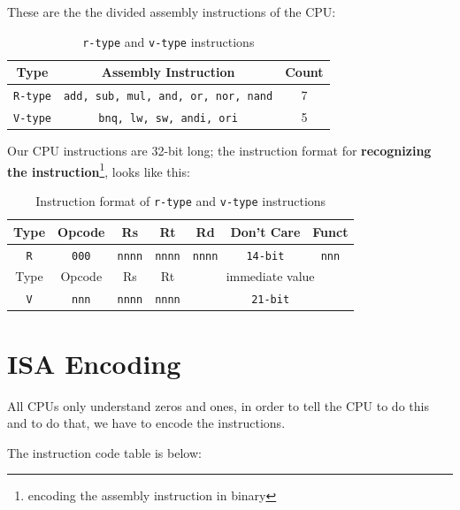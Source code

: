 \documentclass[12pt, dvipsnames, svgnames, x11names, oneside]{book}
\begin{document}
These are the the divided assembly instructions of the CPU:
\begin{table}[h]
\caption{\texttt{r-type} and \texttt{v-type} instructions}
\begin{center}
\begin{tabular}{|c|c|c|}
\hline
Type & Assembly Instruction & Count \\
\hline
\hline
\texttt{R-type} & \texttt{add, sub, mul, and, or, nor, nand} & 7 \\
\hline
\texttt{V-type} & \texttt{bnq, lw, sw, andi, ori} & 5 \\
\hline
\end{tabular}
\end{center}
\end{table}\label{sec:table:isa-insts}

Our CPU instructions are 32-bit long; the instruction format for \textbf{recognizing the instruction}\footnote{encoding the assembly instruction in binary}, looks like this:

\begin{table}[h]
\caption{Instruction format of \texttt{r-type} and \texttt{v-type} instructions}
\begin{center}
\begin{tabular}{|c|c|c|c|c|c|c|}
\hline
Type & Opcode & Rs & Rt & Rd & Don't Care & Funct \\
\hline
\texttt{R} & \texttt{000} & \texttt{nnnn} & \texttt{nnnn} & \texttt{nnnn} & \texttt{14-bit} & \texttt{nnn} \\
\hline
\hline
Type & Opcode & Rs & Rt & \multicolumn{3}{|c|}{immediate value} \\ \hline
\texttt{V} & \texttt{nnn} & \texttt{nnnn} & \texttt{nnnn} & \multicolumn{3}{|c|}{\texttt{21-bit}} \\
\hline
\end{tabular}
\end{center}
\end{table}

\section{ISA Encoding}\label{sec:isa-encode}
All CPUs only understand zeros and ones, in order to tell the CPU to do this and to do that, we have to encode the instructions.

The instruction code table is below:
\end{document}
